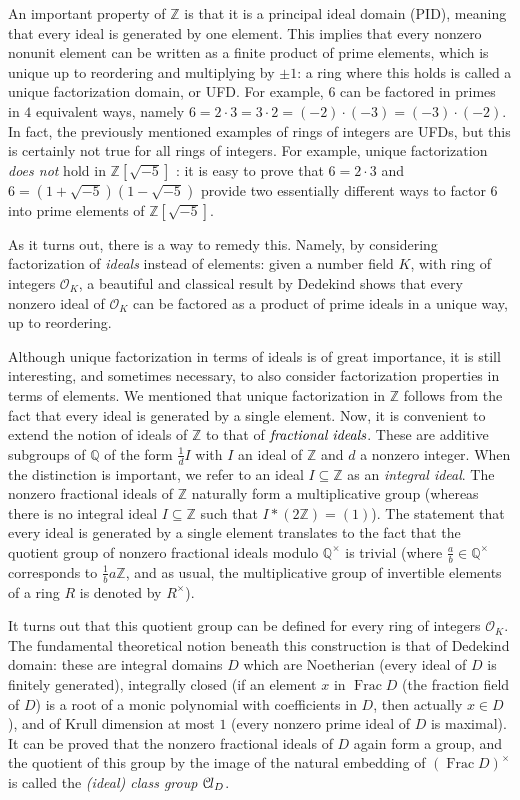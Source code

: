 \documentclass[a4paper,USenglish,cleveref, autoref, thm-restate]{lipics-v2021}
\newcommand*{\OK}[1][K]{\mathcal{O}_{#1}}
\newcommand*{\Cl}{\mathcal{C}\kern-.075em l}
\newcommand{\Q}{\mathbb{Q}}
\newcommand{\Z}{\mathbb{Z}}
\DeclareMathOperator{\Frac}{Frac}
\begin{document}
An important property of $\Z$ is that it is a principal ideal domain (PID), meaning that every ideal is generated by one element. This implies that every nonzero nonunit element can be written as a
finite product of prime elements, which is unique up to reordering and multiplying by $\pm 1$: a ring where this holds is called a unique factorization domain, or UFD.
For example, $6$ can be factored in primes in $4$ equivalent ways, namely $6=2\cdot 3=3\cdot2=(-2)\cdot (-3)=(-3) \cdot (-2)$.
In fact, the previously mentioned examples of rings of integers are UFDs, but this is certainly not true for all rings of integers. For example, unique factorization \emph{does not} hold in $\Z[\sqrt{-5}]$
: it is easy to prove that $6=2\cdot3$ and $6=(1+\sqrt{-5}) (1-\sqrt{-5})$ provide two essentially different ways to factor $6$ into prime elements of $\Z[\sqrt{-5}]$.

As it turns out, there is a way to remedy this. Namely, by considering factorization of \emph{ideals} instead of elements: given a number field $K$, with ring of integers $\OK$, a beautiful and classical result by Dedekind shows that every nonzero ideal of $\OK$ can be factored as a product of prime ideals in a unique way, up to reordering.

Although unique factorization in terms of ideals is of great importance, it is still interesting, and sometimes
necessary, to also consider factorization properties in terms of elements.
We mentioned that unique factorization in $\Z$ follows from the fact that every ideal is generated by a single element.
Now, it is convenient to extend the notion of ideals of $\Z$ to that of $\emph{fractional ideals}$. 
These are additive subgroups of $\Q$ of the form $\frac{1}{d} I$ with $I$ an ideal of $\Z$ and $d$ a nonzero integer.
When the distinction is important, we refer to an ideal $I \subseteq \Z$ as an \emph{integral ideal}.
The nonzero fractional ideals of $\Z$ naturally form a multiplicative group (whereas there is no integral ideal $I\subseteq \Z$ such that $I*(2\Z)=(1)$).
The statement that every ideal is generated by a single element
translates to the fact that the quotient group of nonzero fractional ideals modulo $\Q^\times$ is trivial (where $\frac{a}{b} \in \Q^\times$ corresponds to $\frac{1}{b} a \Z$, and as usual, the multiplicative group of invertible elements of a ring $R$ is denoted by $R^{\times}$).

It turns out that this quotient group can be defined for every ring of integers $\OK$.
The fundamental theoretical notion beneath this construction is that of Dedekind domain: these are integral domains $D$ which are Noetherian (every ideal of $D$ is finitely generated), integrally closed (if an element $x$ in $\Frac D$ (the fraction field of $D$) is a root of a monic polynomial with coefficients in $D$, then actually $x \in D$), and of Krull dimension at most $1$ (every nonzero prime ideal of $D$ is maximal).
It can be proved that the nonzero fractional ideals of $D$
again form a group, and the quotient of this group by the image of the natural embedding of $(\Frac D)^\times$ is called the \emph{\textup{(}ideal\textup{)} class group} $\Cl_{D}$.
\end{document}
